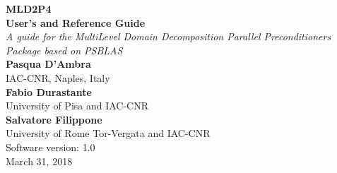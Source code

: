 \documentclass[a4paper,twoside,11pt]{article}
\begin{document}
{\LARGE\bfseries MLD2P4\\[.8ex] User's and Reference Guide}\\[\baselineskip]
\emph{\large A guide for the MultiLevel Domain Decomposition 
Parallel Preconditioners Package
based on PSBLAS}\\[3ex]
{\large\bfseries Pasqua D'Ambra}\\
\large IAC-CNR, Naples, Italy\\[3ex]
{\large\bfseries Fabio Durastante}\\
\large University of Pisa and IAC-CNR\\[3ex]
{\large\bfseries Salvatore Filippone} \\
\large University of Rome Tor-Vergata and IAC-CNR
\\[10ex]
Software version: 1.0\\
 March 31, 2018
\clearpage
\ \\
\thispagestyle{empty}
\clearpage

\setcounter{page}{1}    %


\cleardoublepage

\begingroup
  \renewcommand*{\thepage}{toc}
  \tableofcontents
\endgroup  
\cleardoublepage

\setcounter{page}{1}    %









\cleardoublepage
\appendix

\cleardoublepage

\end{document}
